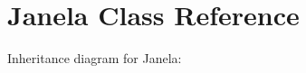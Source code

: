 \hypertarget{classJanela}{}\section{Janela Class Reference}
\label{classJanela}


Inheritance diagram for Janela\+:
